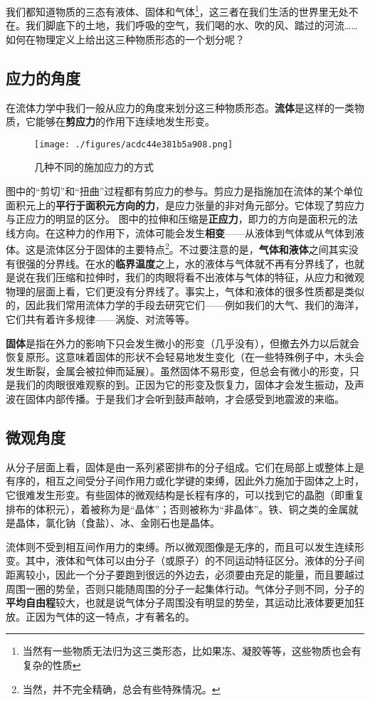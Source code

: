 
我们都知道物质的三态有液体、固体和气体\footnote{当然有一些物质无法归为这三类形态，比如果冻、凝胶等等，这些物质也会有复杂的性质}，这三者在我们生活的世界里无处不在。我们脚底下的土地，我们呼吸的空气，我们喝的水、吹的风、踏过的河流…… 如何在物理定义上给出这三种物质形态的一个划分呢？

\subsection{应力的角度}
在流体力学中我们一般从应力的角度来划分这三种物质形态。\textbf{流体}是这样的一类物质，它能够在\textbf{剪应力}的作用下连续地发生形变。

\begin{figure}[ht]
\centering
\texttt{[image: ./figures/acdc44e381b5a908.png]}
\caption{几种不同的施加应力的方式} \label{fig_SLG_1}
\end{figure}

图中的“剪切”和“扭曲”过程都有剪应力的参与。剪应力是指施加在流体的某个单位面积元上的\textbf{平行于面积元方向的力}，是应力张量的非对角元部分。它体现了剪应力与正应力的明显的区分。
图中的拉伸和压缩是\textbf{正应力}，即力的方向是面积元的法线方向。在这种力的作用下，流体可能会发生\textbf{相变}——从液体到气体或从气体到液体。这是流体区分于固体的主要特点\footnote{当然，并不完全精确，总会有些特殊情况。}。不过要注意的是，\textbf{气体和液体}之间其实没有很强的分界线。在水的\textbf{临界温度}之上，水的液体与气体就不再有分界线了，也就是说在我们压缩和拉伸时，我们的肉眼将看不出液体与气体的特征，从应力和微观物理的层面上看，它们更没有分界线了。事实上，气体和液体的很多性质都是类似的，因此我们常用流体力学的手段去研究它们——例如我们的大气、我们的海洋，它们共有着许多规律——涡旋、对流等等。

\textbf{固体}是指在外力的影响下只会发生微小的形变（几乎没有），但撤去外力以后就会恢复原形。这意味着固体的形状不会轻易地发生变化（在一些特殊例子中，木头会发生断裂，金属会被拉伸而延展）。虽然固体不易形变，但总会有微小的形变，只是我们的肉眼很难观察的到。正因为它的形变及恢复力，固体才会发生振动，及声波在固体内部传播。于是我们才会听到鼓声敲响，才会感受到地震波的来临。

\subsection{微观角度}
从分子层面上看，固体是由一系列紧密排布的分子组成。它们在局部上或整体上是有序的，相互之间受分子间作用力或化学键的束缚，因此外力施加于固体之上时，它很难发生形变。有些固体的微观结构是长程有序的，可以找到它的晶胞（即重复排布的体积元），着被称为是“晶体”；否则被称为“非晶体”。铁、铜之类的金属就是晶体，氯化钠（食盐）、冰、金刚石也是晶体。

流体则不受到相互间作用力的束缚。所以微观图像是无序的，而且可以发生连续形变。其中，液体和气体可以由分子（或原子）的不同运动特征区分。液体的分子间距离较小，因此一个分子要跑到很远的外边去，必须要由充足的能量，而且要越过周围一圈的势垒，否则只能随周围的分子一起集体行动。气体分子则不同，分子的\textbf{平均自由程}较大，也就是说气体分子周围没有明显的势垒，其运动比液体要更加狂放。正因为气体的这一特点，才有著名的。
